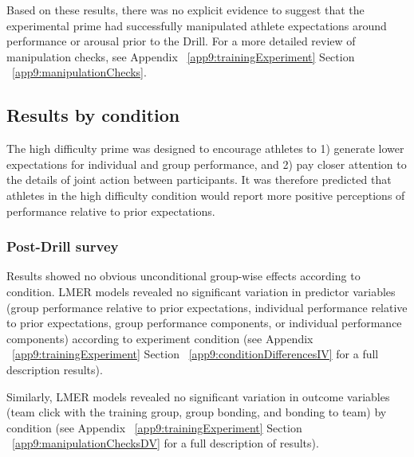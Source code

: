 Based on these results, there was no explicit evidence to suggest that the experimental prime had successfully manipulated athlete expectations around performance or arousal prior to the Drill.  For a more detailed review of manipulation checks, see Appendix ~\ref{app9:trainingExperiment} Section ~\ref{app9:manipulationChecks}.













\subsection{Results by condition}

The high difficulty prime was designed to encourage athletes to 1) generate lower expectations for individual and group performance, and 2) pay closer attention to the details of joint action between participants. It was therefore predicted that athletes in the high difficulty condition would report more positive perceptions of performance relative to prior expectations.


\subsubsection{Post-Drill survey}

Results showed no obvious unconditional group-wise effects according to condition.  LMER models revealed no significant variation in predictor variables (group performance relative to prior expectations, individual performance relative to prior expectations, group performance components, or individual performance components) according to experiment condition (see Appendix ~\ref{app9:trainingExperiment} Section ~\ref{app9:conditionDifferencesIV} for a full description results).

Similarly, LMER models revealed no significant variation in outcome variables (team click with the training group, group bonding, and bonding to team) by condition (see Appendix ~\ref{app9:trainingExperiment} Section ~\ref{app9:manipulationChecksDV} for a full description of results).


